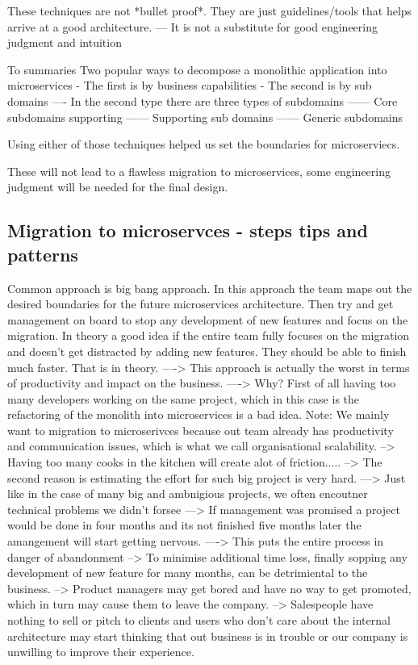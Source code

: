 \documentclass[a4paper, 11pt]{book}
\begin{document}
    These techniques are not *bullet proof*. They are just guidelines/tools that helps arrive at a good architecture.
    --- It is not a substitute for good engineering judgment and intuition

    To summaries
    Two popular ways to decompose a monolithic application into microservices
    - The first is by business capabilities
    - The second is by sub domains
    ---- In the second type there are three types of subdomains
    ------ Core subdomains supporting
    ------ Supporting sub domains
    ------ Generic subdomains

    Using either of those techniques helped us set the boundaries for microserviecs.

    These will not lead to a flawless migration to microservices, some engineering judgment will be needed for the final design.

    \subsection{Migration to microservces - steps tips and patterns}
    Common approach is big bang approach.
    In this approach the team maps out the desired boundaries for the future microservices architecture.
    Then try and get management on board to stop any development of new features and focus on the migration.
    In theory a good idea if the entire team fully focuses on the migration and doesn't get distracted by adding new features. They should be able to finish much faster.
    That is in theory.
    ----> This approach is actually the worst in terms of productivity and impact on the business.
    ----> Why?
    First of all having too many developers working on the same project, which in this case is the refactoring of the monolith into microservices is a bad idea.
    Note: We mainly want to migration to microserivces because out team already has productivity and communication issues, which is what we call organisational scalability.
    --> Having too many cooks in the kitchen will create alot of friction.....
    --> The second reason is estimating the effort for such big project is very hard.
    ---> Just like in the case of many big and ambnigious projects, we often encoutner technical problems we didn't forsee
    ---> If management was promised a project would be done in four months and its not finished five months later the amangement will start getting nervous.
    ----> This puts the entire process in danger of abandonment
    --> To minimise additional time loss, finally sopping any development of new feature for many months, can be detrimiental to the business.
    --> Product managers may get bored and have no way to get promoted, which in turn may cause them to leave the company.
    --> Salespeople have nothing to sell or pitch to clients and users who don't care about the internal architecture may start thinking that out business is in trouble or our company is unwilling to improve their experience.
\end{document}
